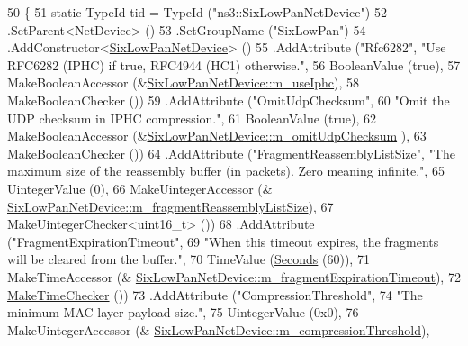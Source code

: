 \begin{DoxyCode}
50 \{
51   \textcolor{keyword}{static} TypeId tid = TypeId (\textcolor{stringliteral}{"ns3::SixLowPanNetDevice"})
52     .SetParent<NetDevice> ()
53     .SetGroupName (\textcolor{stringliteral}{"SixLowPan"})
54     .AddConstructor<\hyperlink{classns3_1_1SixLowPanNetDevice_afb90a509d87f24373689a40f459d7ff6}{SixLowPanNetDevice}> ()
55     .AddAttribute (\textcolor{stringliteral}{"Rfc6282"}, \textcolor{stringliteral}{"Use RFC6282 (IPHC) if true, RFC4944 (HC1) otherwise."},
56                    BooleanValue (\textcolor{keyword}{true}),
57                    MakeBooleanAccessor (&\hyperlink{classns3_1_1SixLowPanNetDevice_a304a0244019df2ca598b655210d82533}{SixLowPanNetDevice::m\_useIphc}),
58                    MakeBooleanChecker ())
59     .AddAttribute (\textcolor{stringliteral}{"OmitUdpChecksum"},
60                    \textcolor{stringliteral}{"Omit the UDP checksum in IPHC compression."},
61                    BooleanValue (\textcolor{keyword}{true}),
62                    MakeBooleanAccessor (&\hyperlink{classns3_1_1SixLowPanNetDevice_aa3503adbbb86b19e4ec2d17f3c8436f7}{SixLowPanNetDevice::m\_omitUdpChecksum}
      ),
63                    MakeBooleanChecker ())
64     .AddAttribute (\textcolor{stringliteral}{"FragmentReassemblyListSize"}, \textcolor{stringliteral}{"The maximum size of the reassembly buffer (in packets).
       Zero meaning infinite."},
65                    UintegerValue (0),
66                    MakeUintegerAccessor (&
      \hyperlink{classns3_1_1SixLowPanNetDevice_acf2402dc29d4865287993a508b74c855}{SixLowPanNetDevice::m\_fragmentReassemblyListSize}),
67                    MakeUintegerChecker<uint16\_t> ())
68     .AddAttribute (\textcolor{stringliteral}{"FragmentExpirationTimeout"},
69                    \textcolor{stringliteral}{"When this timeout expires, the fragments will be cleared from the buffer."},
70                    TimeValue (\hyperlink{group__timecivil_ga33c34b816f8ff6628e33d5c8e9713b9e}{Seconds} (60)),
71                    MakeTimeAccessor (&
      \hyperlink{classns3_1_1SixLowPanNetDevice_ace8f2bb99c947fdaa963d8372467642c}{SixLowPanNetDevice::m\_fragmentExpirationTimeout}),
72                    \hyperlink{group__time_ga7032965bd4afa578691d88c09e4481c1}{MakeTimeChecker} ())
73     .AddAttribute (\textcolor{stringliteral}{"CompressionThreshold"},
74                    \textcolor{stringliteral}{"The minimum MAC layer payload size."},
75                    UintegerValue (0x0),
76                    MakeUintegerAccessor (&
      \hyperlink{classns3_1_1SixLowPanNetDevice_a61c90503b8ea0015e2c3e4dc1f599582}{SixLowPanNetDevice::m\_compressionThreshold}),

\end{DoxyCode}
